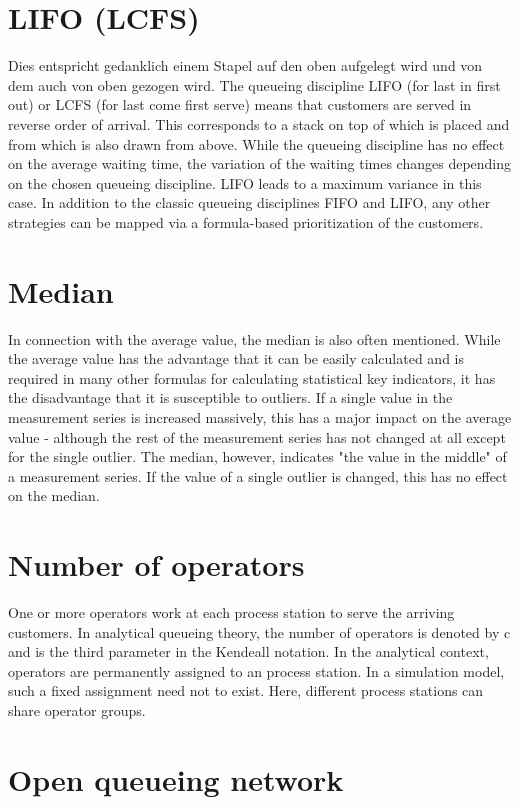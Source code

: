 \section*{LIFO (LCFS)}


Dies entspricht gedanklich einem Stapel auf den oben aufgelegt wird und von dem auch von oben gezogen wird.
The queueing discipline LIFO (for last in first out) or LCFS (for last come first serve) means
that customers are served in reverse order of arrival. This corresponds to a stack on top of which is
placed and from which is also drawn from above. While the queueing discipline has no effect on the
average waiting time, the variation of the waiting times changes depending on the chosen queueing discipline.
LIFO leads to a maximum variance in this case. In addition to the classic queueing disciplines
FIFO and LIFO, any other strategies can be mapped via a formula-based prioritization of the customers.

\section*{Median}


In connection with the average value,
the median is also often mentioned. While the average value has the advantage
that it can be easily calculated and is required in many other formulas for
calculating statistical key indicators, it has the disadvantage that it is
susceptible to outliers. If a single value in the measurement series is
increased massively, this has a major impact on the average value - although
the rest of the measurement series has not changed at all except for the
single outlier. The median, however, indicates "the value in the middle"
of a measurement series. If the value of a single outlier is changed,
this has no effect on the median.

\section*{Number of operators}


One or more operators work at each process station to serve
the arriving customers. In analytical queueing theory,
the number of operators is denoted by c and is the third parameter in the Kendeall notation.
In the analytical context, operators are permanently assigned to an process station.
In a simulation model, such a fixed assignment need not to exist.
Here, different process stations can share operator groups.

\section*{Open queueing network}


